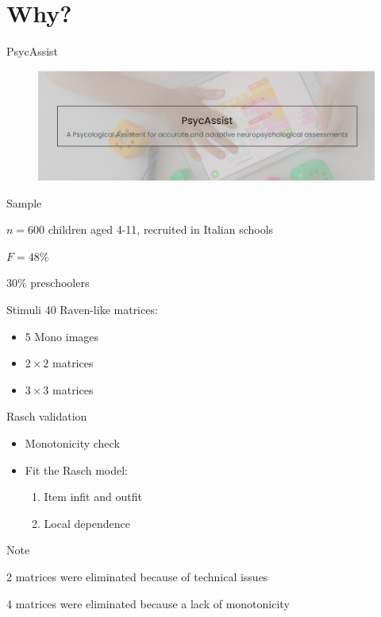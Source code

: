 \documentclass{beamer}
\begin{document}
\section{Why?}

\begin{frame}{PsycAssist}
	\begin{figure}
		\centering
		\includegraphics[width=.6\linewidth]{img/psyc.png}
	\end{figure}
	
	\pause
	
	\begin{exampleblock}{Sample}
		
		\footnotesize
		$n = 600$ children aged 4-11, recruited in Italian schools 
		
		$F = 48$\%
		
		$30$\% preschoolers
	
	\end{exampleblock}
	
	\pause
	
		\begin{exampleblock}{Stimuli}
		\footnotesize
		40 Raven-like matrices: 

		\begin{itemize}
			\item 5 Mono images 
			\item $2 \times 2$ matrices
			\item $3 \times 3$ matrices
		\end{itemize}
		
	\end{exampleblock}
\end{frame}

\begin{frame}{Rasch validation}
	
	\begin{itemize}
	\item Monotonicity check
	
	\item Fit the Rasch model: 
	
	\begin{enumerate}
		\item Item infit and outfit
		\item Local dependence
	\end{enumerate}
	\end{itemize}
	
	\pause
	
	\begin{block}{Note}
		
		2 matrices were eliminated because of technical issues 
		
		4 matrices were eliminated because a lack of monotonicity 
	
	\end{block}
	
	
\end{frame}
\end{document}
